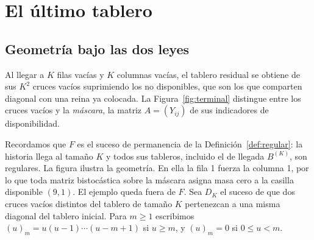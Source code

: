 \section{El último tablero}\label{terminal}

\subsection{Geometría bajo las dos leyes}

Al llegar a $K$ filas vacías y $K$ columnas vacías, el tablero residual se obtiene de sus $K^2$
cruces vacíos suprimiendo los no disponibles, que son los que comparten diagonal con una reina ya
colocada. La Figura~\ref{fig:terminal} distingue entre los cruces vacíos y la \emph{máscara}, la
matriz $A=(Y_{ij})$ de sus indicadores de disponibilidad.


Recordamos que $F$ es el suceso de permanencia de la Definición~\ref{def:regular}: la historia llega
al tamaño $K$ y todos sus tableros, incluido el de llegada $B^{(K)}$, son regulares. La figura ilustra la
geometría. En ella la fila 1 fuerza la
columna 1, por lo que toda matriz bistocástica sobre la máscara asigna masa cero a la casilla
disponible $(9,1)$. El ejemplo queda fuera de $F$. Sea
$D_K$ el suceso de que dos cruces vacíos distintos del tablero de tamaño $K$ pertenezcan a una misma
diagonal del tablero inicial. Para $m\ge 1$ escribimos
$(u)_m=u(u-1)\cdots(u-m+1)$ si
$u\ge m$, y $(u)_m=0$ si $0\le u<m$.

